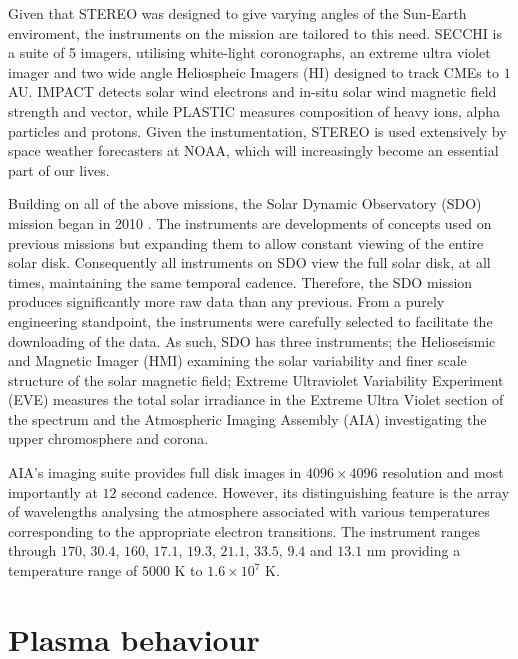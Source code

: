 Given that STEREO was designed to give varying angles of the Sun-Earth  enviroment, the instruments on the mission are tailored to this need.
SECCHI is a suite of 5 imagers, utilising white-light coronographs, an extreme ultra violet imager and two wide angle Heliospheic Imagers (HI) designed to track CMEs to $1$ AU.
IMPACT detects solar wind electrons and in-situ solar wind magnetic field strength and vector, while PLASTIC measures composition of heavy ions, alpha particles and protons. 
Given the instumentation, STEREO is used extensively by space weather forecasters at NOAA, which will increasingly become an essential part of our lives.

Building on all of the above missions, the Solar Dynamic Observatory (SDO) mission began in 2010 \cite{Kaiser2008}.
The instruments are developments of concepts used on previous missions but expanding them to allow constant viewing of the entire solar disk.
Consequently all instruments on SDO view the full solar disk, at all times, maintaining the same temporal cadence. 
Therefore, the SDO mission produces significantly more raw data than any previous.
From a purely engineering standpoint, the instruments were carefully selected to facilitate the downloading of the data.
As such, SDO has three instruments; the Helioseismic and Magnetic Imager (HMI) examining the solar variability and finer scale structure of the solar magnetic field; Extreme Ultraviolet Variability Experiment (EVE) measures the total solar irradiance in the Extreme Ultra Violet section of the spectrum and the Atmospheric Imaging Assembly (AIA) investigating the upper chromosphere and corona.

AIA's imaging suite provides full disk images in $4096 \times 4096$ resolution and most importantly at $12$ second cadence.
However, its distinguishing feature is the array of wavelengths analysing the atmosphere \cite{AIAspec} associated with various temperatures corresponding to the appropriate electron transitions.
The instrument ranges through $170$, $30.4$, $160$, $17.1$, $19.3$, $21.1$, $33.5$, $9.4$ and $13.1$ nm providing a temperature range of $5000$ K to $1.6 \times 10^7$ K.




\section{Plasma behaviour}

